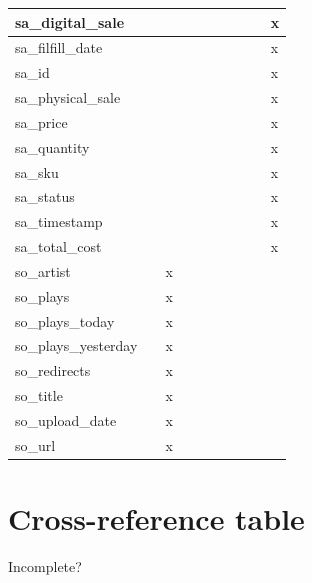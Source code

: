 \documentclass[11pt, a4paper]{report}
\begin{document}
\begin{longtable}{|l|l|l|l|l|l|l|l|l|l|}
sa\_digital\_sale       &                &   &   &   &   &   &   &   & x \\ \hline
sa\_filfill\_date       &                &   &   &   &   &   &   &   & x \\ \hline
sa\_id                  &                &   &   &   &   &   &   &   & x \\ \hline
sa\_physical\_sale      &                &   &   &   &   &   &   &   & x \\ \hline
sa\_price               &                &   &   &   &   &   &   &   & x \\ \hline
sa\_quantity            &                &   &   &   &   &   &   &   & x \\ \hline
sa\_sku                 &                &   &   &   &   &   &   &   & x \\ \hline
sa\_status              &                &   &   &   &   &   &   &   & x \\ \hline
sa\_timestamp           &                &   &   &   &   &   &   &   & x \\ \hline
sa\_total\_cost         &                &   &   &   &   &   &   &   & x \\ \hline
so\_artist              &                & x &   &   &   &   &   &   &   \\ \hline
so\_plays               &                & x &   &   &   &   &   &   &   \\ \hline
so\_plays\_today        &                & x &   &   &   &   &   &   &   \\ \hline
so\_plays\_yesterday    &                & x &   &   &   &   &   &   &   \\ \hline
so\_redirects           &                & x &   &   &   &   &   &   &   \\ \hline
so\_title               &                & x &   &   &   &   &   &   &   \\ \hline
so\_upload\_date        &                & x &   &   &   &   &   &   &   \\ \hline
so\_url                 &                & x &   &   &   &   &   &   &   \\ \hline

\end{longtable}

\clearpage
\section{Cross-reference table}
Incomplete?
\end{document}
